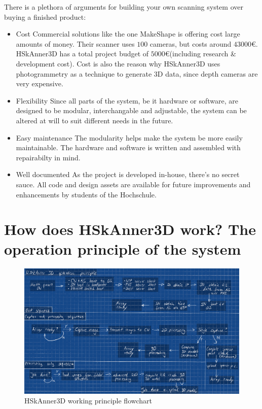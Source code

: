 	There is a plethora of arguments for building your own scanning system over buying a finished product:
	\begin{itemize}
		\item Cost \newline
			Commercial solutions like the one MakeShape is offering cost large amounts of money. Their scanner uses $100$ cameras, but costs around $43 000$\euro. HSkAnner3D has a total project budget of $5 000$\euro (including research \& development cost). Cost is also the reason why HSkAnner3D uses photogrammetry as a technique to generate 3D data, since depth cameras are very expensive.
		\item Flexibility \newline
			Since all parts of the system, be it hardware or software, are designed to be modular, interchangable and adjustable, the system can be altered at will to suit different needs in the future.
		\item Easy maintenance \newline
			The modularity helps make the system be more easily maintainable. The hardware and software is written and assembled with repairabilty in mind.
		\item Well documented \newline
			As the project is developed in-house, there's no secret sauce. All code and design assets are available for future improvements and enhancements by students of the Hochschule.
	\end{itemize}

\section{How does HSkAnner3D work? The operation principle of the system}
    \begin{figure}[H]
        \centerline{\includegraphics[width=\linewidth]{what/processing-chain-system.png}}
        \caption{HSkAnner3D working principle flowchart}
    \label{operation-flowchart-system}
    \end{figure}